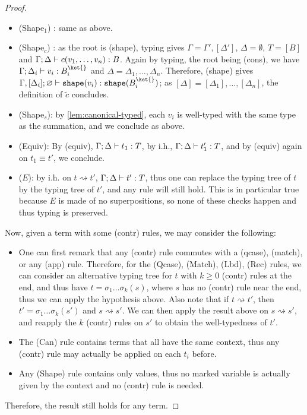 \documentclass[10pt,a4paper]{article}
\newcommand{\bvar}{B}
\newcommand\bkvar{\bvar^{\ket{}}}
\newcommand{\shape}[1]{\mathtt{shape}(#1)}
\newcommand{\typing}[4]{
  \ifx&#1&\varnothing \else #1\fi; 
  \ifx&#2&\varnothing \else #2\fi 
  \vdash {#3} : #4
}
\newcommand{\shapemarker}[1]{[#1]}
\newcommand{\reduces}{\rightsquigarrow}
\newcommand{\evalcontext}{\ensuremath{E}}
\begin{document}
\begin{proof}
\begin{itemize}
    \item (Shape$_1$) : same as above.

    \item (Shape$_c$) : as the root is (shape), typing gives $\Gamma
      = \Gamma', \shapemarker{\Delta'}$, $\Delta = \emptyset$, $T =
      \shapemarker{\bvar}$ and $\typing \Gamma \Delta {c(v_1, \dots,
      v_n)} \bvar$.
      Again by typing, the root being (cons), we have $\typing \Gamma
      {\Delta_i} {v_i} \bkvar_i$ and $\Delta = \Delta_1, \dots, \Delta_n$.
      Therefore, (shape) gives $\typing {\Gamma,
      \shapemarker{\Delta_i}} {} {\shape{v_i}} {\shape{\bkvar_i}}$;
      as $\shapemarker{\Delta} = \shapemarker{\Delta_1}, \dots,
      \shapemarker{\Delta_n}$, the definition of $\tilde c$ concludes.
    \item (Shape$_s$): by \autoref{lem:canonical-typed}, each $v_i$
      is well-typed with the same type as the summation, and we
      conclude as above.

    \item (Equiv): By (equiv), $\typing \Gamma \Delta {t_1} T$, by
      i.h., $\typing \Gamma \Delta {t_1'} T$, and by (equiv) again on
      $t_1 \equiv t'$, we conclude.

    \item (\evalcontext): by i.h. on $t \reduces t'$, $\typing \Gamma
      \Delta {t'} T$, thus one can replace the typing tree of $t$ by
      the typing tree of $t'$, and any rule will still hold.
      This is in particular true because $\evalcontext$ is made of no
      superpositions, so none of these checks happen and
      thus typing is preserved.
  \end{itemize}

  Now, given a term with some (contr) rules, we may consider the following:

  \begin{itemize}
    \item One can first remark that any (contr) rule commutes with a
      (qcase), (match), or any (app) rule.
      Therefore, for the (Qcase), (Match), (Lbd), (Rec)
      rules, we can consider an alternative typing tree for $t$ with
      $k \geq 0$ (contr) rules at the end,
      and thus have $t = \sigma_1 \dots \sigma_k(s)$, where $s$ has
      no (contr) rule near the end, thus we can apply the hypothesis above.
      Also note that if $t \reduces t'$, then $t' = \sigma_1 \dots
      \sigma_k(s')$ and $s \reduces s'$. We can then apply the result
      above on $s \reduces s'$,
      and reapply the $k$ (contr) rules on $s'$ to obtain the
      well-typedness of $t'$.
    \item The (Can) rule contains terms that all have the same
      context, thus any (contr) rule may actually be applied on each
      $t_i$ before.
    \item Any (Shape) rule contains only values, thus no marked
      variable is actually given by the context and no (contr) rule is needed.
  \end{itemize}

  Therefore, the result still holds for any term. \qedhere
\end{proof}
\end{document}
